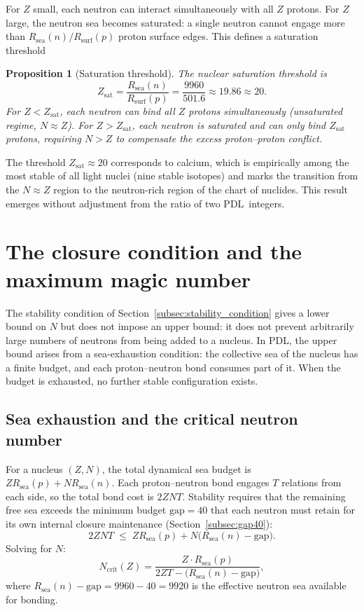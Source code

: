 \documentclass[11pt,a4paper]{article}
\newtheorem{proposition}[theorem]{Proposition}
\theoremstyle{definition}
\newcommand{\PDL}{\textnormal{PDL}}
\newcommand{\Rsurf}{R_{\mathrm{surf}}}
\newcommand{\Rsea}{R_{\mathrm{sea}}}
\newcommand{\Zsat}{Z_{\mathrm{sat}}}
\begin{document}
For $Z$ small, each neutron can interact simultaneously with all $Z$ protons. For $Z$ large, the neutron sea becomes saturated: a single neutron cannot engage more than $\Rsea(n)/\Rsurf(p)$ proton surface edges. This defines a saturation threshold

\begin{proposition}[Saturation threshold]
\label{prop:Zsat}
The nuclear saturation threshold is
\[
\Zsat = \frac{\Rsea(n)}{\Rsurf(p)} = \frac{9960}{501.6} \approx 19.86 \approx 20.
\]
For $Z < \Zsat$, each neutron can bind all $Z$ protons simultaneously (unsaturated regime, $N \approx Z$). For $Z > \Zsat$, each neutron is saturated and can only bind $\Zsat$ protons, requiring $N > Z$ to compensate the excess proton--proton conflict.
\end{proposition}

The threshold $\Zsat \approx 20$ corresponds to calcium, which is empirically among the most stable of all light nuclei (nine stable isotopes) and marks the transition from the $N \approx Z$ region to the neutron-rich region of the chart of nuclides. This result emerges without adjustment from the ratio of two \PDL\ integers.

\section{The closure condition and the maximum magic number}
\label{sec:closure}

The stability condition of Section~\ref{subsec:stability_condition} gives a lower bound on $N$ but does not impose an upper bound: it does not prevent arbitrarily large numbers of neutrons from being added to a nucleus. In \PDL, the upper bound arises from a sea-exhaustion condition: the collective sea of the nucleus has a finite budget, and each proton--neutron bond consumes part of it. When the budget is exhausted, no further stable configuration exists.

\subsection{Sea exhaustion and the critical neutron number}
\label{subsec:Ncrit}

For a nucleus $(Z,N)$, the total dynamical sea budget is $Z\Rsea(p) + N\Rsea(n)$. Each proton--neutron bond engages $T$ relations from each side, so the total bond cost is $2ZNT$. Stability requires that the remaining free sea exceeds the minimum budget $\mathrm{gap} = 40$ that each neutron must retain for its own internal closure maintenance (Section~\ref{subsec:gap40}):
\[
2ZNT \;\leq\; Z\Rsea(p) + N\bigl(\Rsea(n) - \mathrm{gap}\bigr).
\]
Solving for $N$:
\[
N_{\mathrm{crit}}(Z) = \frac{Z \cdot \Rsea(p)}{2ZT - \bigl(\Rsea(n) - \mathrm{gap}\bigr)},
\]
where $\Rsea(n) - \mathrm{gap} = 9960 - 40 = 9920$ is the effective neutron sea available for bonding.
\end{document}
